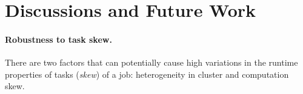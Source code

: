 \section{Discussions and Future Work}
\label{sec:discuss}


\paragraph{Robustness to task skew.} There are two factors
that can potentially cause high variations in the runtime properties
of tasks (\textit{skew}) of a job: heterogeneity in cluster and
computation skew.
